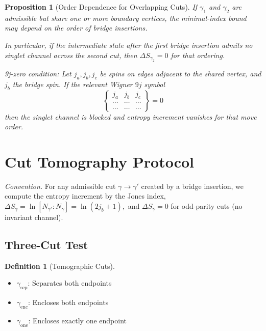 \documentclass[11pt]{article}
\newcommand{\Index}[2]{\left[#1:#2\right]}
\theoremstyle{plain}
\newtheorem{proposition}[theorem]{Proposition}
\theoremstyle{definition}
\newtheorem{definition}[theorem]{Definition}
\begin{document}
\begin{proposition}[Order Dependence for Overlapping Cuts]
  If $\gamma_1$ and $\gamma_2$ are admissible but share one or more boundary vertices,
  the minimal-index bound may depend on the order of bridge insertions.

  In particular, if the intermediate state after the first bridge insertion admits no
  singlet channel across the second cut, then $\Delta S_{\gamma_2}=0$ for that ordering.

  \emph{9j-zero condition:}
  Let $j_a,j_b,j_c$ be spins on edges adjacent to the shared vertex, and $j_b$ the bridge spin.
  If the relevant Wigner \(9j\) symbol
  \[
    \begin{Bmatrix}
      j_a & j_b & j_c \\
      \cdots & \cdots & \cdots \\
      \cdots & \cdots & \cdots
    \end{Bmatrix}
    = 0
  \]
  then the singlet channel is blocked and entropy increment vanishes for that move order.
\end{proposition}

\section{Cut Tomography Protocol}
\label{sec:tomography}

\noindent
\textit{Convention.} For any admissible cut $\gamma\to\gamma'$ created by a bridge insertion, we compute the entropy increment by the Jones index,
\(
  \Delta S_\gamma = \ln \Index{N_{\gamma'}}{N_\gamma} = \ln(2j_b+1),
\)
and $\Delta S_\gamma=0$ for odd-parity cuts (no invariant channel).

\subsection{Three-Cut Test}
\begin{definition}[Tomographic Cuts]
  \begin{itemize}
    \item $\gamma_{\mathrm{sep}}$: Separates both endpoints
    \item $\gamma_{\mathrm{enc}}$: Encloses both endpoints
    \item $\gamma_{\mathrm{one}}$: Encloses exactly one endpoint
  \end{itemize}
\end{definition}
\end{document}
